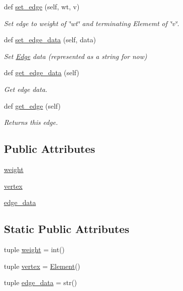 \begin{DoxyCompactItemize}
def \hyperlink{class_bridges_1_1_edge_1_1_edge_aba4ff033130d2e7efcc85360631458e8}{set\+\_\+edge} (self, wt, v)
\begin{DoxyCompactList}\small\item\em Set edge to weight of \char`\"{}wt\char`\"{} and terminating Elememt of \char`\"{}v\char`\"{}. \end{DoxyCompactList}\item 
def \hyperlink{class_bridges_1_1_edge_1_1_edge_a2ff2270572ae079d1db9e03c54c27056}{set\+\_\+edge\+\_\+data} (self, data)
\begin{DoxyCompactList}\small\item\em Set \hyperlink{class_bridges_1_1_edge_1_1_edge}{Edge} data (represented as a string for now) \end{DoxyCompactList}\item 
def \hyperlink{class_bridges_1_1_edge_1_1_edge_a5820f67d43e270bae8295683cf1d548f}{get\+\_\+edge\+\_\+data} (self)
\begin{DoxyCompactList}\small\item\em Get edge data. \end{DoxyCompactList}\item 
def \hyperlink{class_bridges_1_1_edge_1_1_edge_a96ac5e5acb598afb3d417627deb120fc}{get\+\_\+edge} (self)
\begin{DoxyCompactList}\small\item\em Returns this edge. \end{DoxyCompactList}\end{DoxyCompactItemize}
\subsection*{Public Attributes}
\begin{DoxyCompactItemize}
\item 
\hyperlink{class_bridges_1_1_edge_1_1_edge_a7219034dae365e8898fbf4bd901285b4}{weight}
\item 
\hyperlink{class_bridges_1_1_edge_1_1_edge_aa503f86b141009ca9125093b4e903e38}{vertex}
\item 
\hyperlink{class_bridges_1_1_edge_1_1_edge_ae97632efc0ced1c9530eab779d910d79}{edge\+\_\+data}
\end{DoxyCompactItemize}
\subsection*{Static Public Attributes}
\begin{DoxyCompactItemize}
\item 
tuple \hyperlink{class_bridges_1_1_edge_1_1_edge_a693e3e49a05b4e6c6cce8f88d9c63fd4}{weight} = int()
\item 
tuple \hyperlink{class_bridges_1_1_edge_1_1_edge_afecb49b1d5bd539ceb200ca41e072069}{vertex} = \hyperlink{class_bridges_1_1_element_1_1_element}{Element}()
\item 
tuple \hyperlink{class_bridges_1_1_edge_1_1_edge_afa7d56527db8b758137172d7641bf3a7}{edge\+\_\+data} = str()
\end{DoxyCompactItemize}


